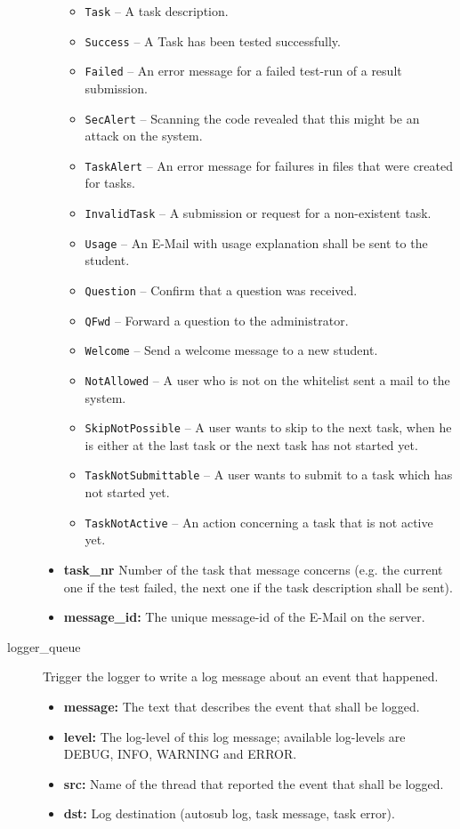 \begin{description}
\begin{itemize}
            \begin{itemize}
				\item {\tt Task} -- A task description.
				\item {\tt Success} -- A Task has been tested successfully.
				\item {\tt Failed} -- An error message for a failed test-run of a result 
					submission.
				\item {\tt SecAlert} -- Scanning the code revealed that this might be an 
					attack on the system.
				\item {\tt TaskAlert} -- An error message for failures in files that were 
					created for tasks.
				\item {\tt InvalidTask} -- A submission or request for a non-existent task.
				\item {\tt Usage} -- An E-Mail with usage explanation shall be sent to the 
					student. 
				\item {\tt Question} -- Confirm that a question was received.
				\item {\tt QFwd} -- Forward a question to the administrator.
				\item {\tt Welcome} -- Send a welcome message to a new student.
				\item {\tt NotAllowed} -- A user who is not on the whitelist sent a mail 
					to the system.
				\item {\tt SkipNotPossible} -- A user wants to skip to the next
					task, when he is either at the last task or the next task has not 
					started yet.
				\item {\tt TaskNotSubmittable} -- A user wants to submit to a task
					which has not started yet.
				\item {\tt TaskNotActive} -- An action concerning a task that is not active 
					yet.
            \end{itemize}

        \item {\bf task\_nr} Number of the task that message concerns (e.g. the current 
			one if the test failed, the next one if the task description shall be sent).
        \item {\bf message\_id:} The unique message-id of the E-Mail on the server.
    \end{itemize}

\item [logger\_queue] Trigger the logger to write a log message about an event that happened.
    \begin{itemize}
        \item {\bf message:} The text that describes the event that shall be logged.
        \item {\bf level:} The log-level of this log message; available log-levels 
			are DEBUG, INFO, WARNING and ERROR.
        \item {\bf src:} Name of the thread that reported the event that shall be logged.
		\item {\bf dst:} Log destination (autosub log, task message, task error).
    \end{itemize}


\end{description}

